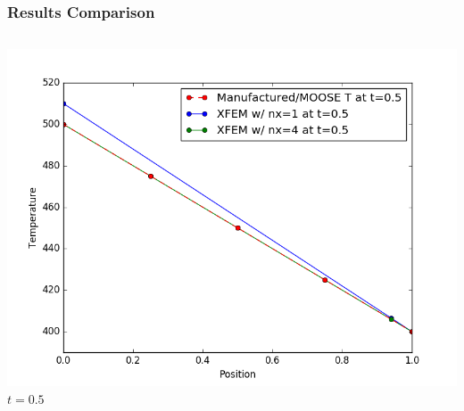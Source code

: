 \documentclass[]{beamer}
\begin{document}
\begin{frame}[t]\frametitle{Results Comparison}
  	\begin{columns}
			\begin{center}
			\includegraphics[scale=0.17]{figures/1D_xy_ls1mat_u_vs_x_05}\\
			$t=0.5$
			
			\null
			

\end{center}
\end{columns}
\end{frame}
\end{document}
